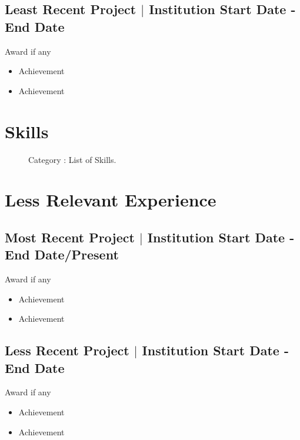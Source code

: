 \documentclass[12pt]{article}
\begin{document}
\subsection*{Least Recent Project $\lvert$ Institution \hfill Start Date - End Date}
\begin{description}
    \item Award if any 
\end{description}
    \begin{itemize}
        \item Achievement
        \item Achievement
    \end{itemize}
  
\section*{Skills}
\begin{description}
    \item[]Category :  List of Skills.
\end{description}

\section*{Less Relevant Experience}
\subsection*{Most Recent Project $\lvert$ Institution \hfill Start Date - End Date/Present}
\begin{description}
    \item Award if any 
\end{description}
    \begin{itemize}
        \item Achievement
        \item Achievement
    \end{itemize}

\subsection*{Less Recent Project $\lvert$ Institution \hfill Start Date - End Date}
\begin{description}
    \item Award if any 
\end{description}
    \begin{itemize}
        \item Achievement
        \item Achievement
    \end{itemize}
\end{document}
